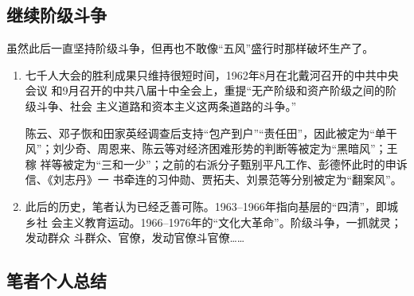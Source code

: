 \subsection{继续阶级斗争}

虽然此后一直坚持阶级斗争，但再也不敢像“五风”盛行时那样破坏生产了。

\begin{enumerate}
\item 七千人大会的胜利成果只维持很短时间，1962年8月在北戴河召开的中共中央会议
  和9月召开的中共八届十中全会上，重提“无产阶级和资产阶级之间的阶级斗争、社会
  主义道路和资本主义这两条道路的斗争。”

  陈云、邓子恢和田家英经调查后支持“包产到户”“责任田”，因此被定为“单干
  风”；刘少奇、周恩来、陈云等对经济困难形势的判断等被定为“黑暗风”；王稼
  祥等被定为“三和一少”；之前的右派分子甄别平凡工作、彭德怀此时的申诉信、《刘志丹》一
  书牵连的习仲勋、贾拓夫、刘景范等分别被定为“翻案风”。

\item 此后的历史，笔者认为已经乏善可陈。1963--1966年指向基层的“四清”，即城乡社
  会主义教育运动。1966--1976年的“文化大革命”。阶级斗争，一抓就灵；发动群众
  斗群众、官僚，发动官僚斗官僚……

\end{enumerate}

\subsection{笔者个人总结}

